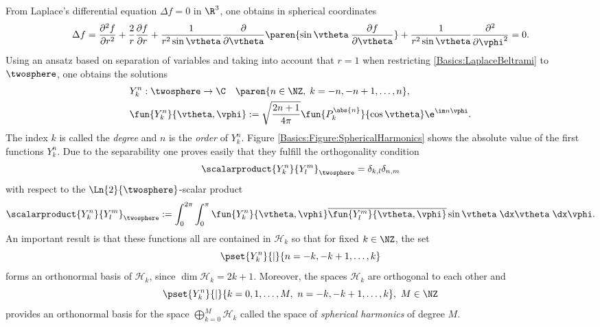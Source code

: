 From Laplace's differential equation $\Delta f = 0$ in $\R^3$, one obtains in spherical coordinates
\begin{equation}
  \label{Basics:LaplaceBeltrami}
  \Delta f = \frac{\partial^2 f}{\partial r^2} + \frac{2}{r}\frac{\partial f}{\partial
  r} + \frac{1}{r^2 \sin \vtheta}\frac{\partial}{\partial \vtheta}\paren{\sin \vtheta \: \frac{\partial f}{\partial
  \vtheta}} + \frac{1}{r^2 \sin \vtheta}\frac{\partial^2}{\partial \vphi^2} = 0.
\end{equation}
Using an ansatz based on separation of variables and taking into account that $r = 1$ when restricting 
\eqref{Basics:LaplaceBeltrami} to $\twosphere$, one obtains the solutions
\begin{equation}
  \label{Basics:SphericalHarmonicsDefinition}
  \begin{split}
    & Y_{k}^n: \twosphere \rightarrow \C \quad \paren{n \in \NZ,\; k = -n,-n+1,\ldots,n},\\
    & \fun{Y_{k}^n}{\vtheta,\vphi} := \sqrt{\frac{2n+1}{4\pi}} 
    \fun{P_{k}^{\abs{n}}}{\cos \vtheta} \e^{\im n \vphi}.
  \end{split}
\end{equation}
The index $k$ is called the \emph{degree} and $n$ is the \emph{order} of $Y_{k}^n$. 
Figure \ref{Basics:Figure:SphericalHarmonics} shows the absolute value of the first
functions $Y_{k}^{n}$.
Due to the separability one proves easily that they fulfill the orthogonality condition
\begin{equation}
  \nonumber
  \scalarproduct{Y_{k}^n}{Y_{l}^m}_{\twosphere} = \delta_{k,l} \delta_{n,m}
\end{equation}
with respect to the $\Ln{2}{\twosphere}$-scalar product 
\begin{equation}
  \nonumber
  \scalarproduct{Y_{k}^n}{Y_{l}^m}_{\twosphere} := \int_{0}^{2\pi} \int_{0}^{\pi} \fun{Y_{k}^n}{\vtheta,\vphi} \overline{\fun{Y_{l}^m}{\vtheta,\vphi}} \sin \vtheta \; \dx \vtheta \; \dx \vphi.
\end{equation}
An important result is that these functions all are contained in 
$\mathcal{H}_k$ so that for fixed $k \in \NZ$, the set
\begin{equation}
  \nonumber
  \pset{Y_{k}^n}{|}{n = -k,-k+1,\ldots,k}
\end{equation}
forms an orthonormal basis of $ \mathcal{H}_k$, since $\dim \mathcal{H}_k =
2k+1$. Moreover, the spaces $\mathcal{H}_k$ are orthogonal
to each other and
$$\pset{Y_{k}^n}{|}{k = 0,1,\ldots,M,\ n = -k,-k+1,\ldots,k},\ M \in \NZ$$ 
provides an orthonormal basis for the space $\bigoplus_{k=0}^{M}\mathcal{H}_k$ called
the space of \emph{spherical harmonics} of degree $M$.

